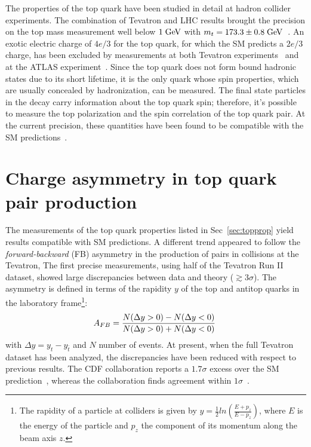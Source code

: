 The properties of the top quark have been studied in detail at hadron
collider experiments. The combination of Tevatron and LHC results
brought the precision on the top mass measurement well below $1 \; \mathrm{GeV}{}$
with $m_t=173.3\pm{}0.8 \; \mathrm{GeV}{}$~\cite{topmass}.
An exotic electric charge of $4e/3$ for the top quark, for which the
SM predicts a $2e/3$ charge, has been excluded by measurements at both
Tevatron experiments~\cite{Abazov:2006vd,Aaltonen:2010js} and at the
ATLAS experiment~\cite{Aad:2013uza}.
Since the top quark does not form bound hadronic states due to its
short lifetime, it is the only quark whose spin properties, which are usually
concealed by hadronization, can be measured. The final state
particles in the decay carry information about the top quark spin;
therefore, it's possible to measure the top polarization and the spin
correlation of the top quark pair. At the current precision, these
quantities have been found to be compatible with the SM
predictions~\cite{Aad:2013ksa,Aad:2014pwa,Chatrchyan:2013wua}. 

\section{Charge asymmetry in top quark pair production}
\label{sec:topca}

The measurements of the top quark properties listed in
Sec~\ref{sec:topprop} yield results compatible with SM predictions.
A different trend appeared to follow the {\it forward-backward}
(FB) asymmetry in the production of \ttbar{} pairs in \ppbar{}
collisions at the Tevatron, The first precise measurements, using half
of the Tevatron Run II dataset, showed large discrepancies between
data and theory ($\gtrsim 3\sigma$). 
The asymmetry \afb{} is defined in terms of the rapidity $y$ of the top and
antitop quarks in the laboratory frame\footnote{The rapidity of a
  particle at colliders is given by $y=\frac{1}{2}ln(\frac{E+p_z}{E-p_z})$, where
  $E$ is the energy of the particle and $p_z$ the component of its
  momentum along the beam axis $z$.}: 
\begin{equation}
\label{eq:afb}
A_{FB}{}=\frac{N(\Delta{}y>0)-N(\Delta{}y<0)}{N(\Delta{}y>0)+N(\Delta{}y<0)}
\phantom{,}
\end{equation}
with $\Delta{}y=y_t - y_{\bar{t}}$ and $N$ number of events.
At present, when the full Tevatron dataset has been analyzed, the
discrepancies have been reduced with respect to previous results. The
CDF collaboration reports a $1.7\sigma$ excess over the SM
prediction~\cite{Aaltonen:2012it}, whereas the \dzero{} collaboration
finds agreement within $1\sigma$~\cite{Abazov:2014cca}.

